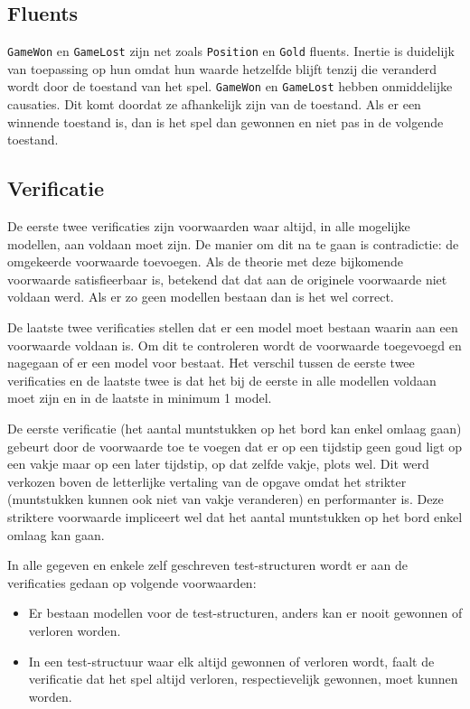 \documentclass[a4paper,12pt]{article}
\begin{document}
\subsection{Fluents}
\texttt{GameWon} en \texttt{GameLost} zijn net zoals \texttt{Position} en \texttt{Gold} fluents. Inertie is duidelijk van toepassing op hun omdat hun waarde hetzelfde blijft tenzij die veranderd wordt door de toestand van het spel. \texttt{GameWon} en \texttt{GameLost} hebben onmiddelijke causaties. Dit komt doordat ze afhankelijk zijn van de toestand. Als er een winnende toestand is, dan is het spel dan gewonnen en niet pas in de volgende toestand.

\subsection{Verificatie}
De eerste twee verificaties zijn voorwaarden waar altijd, in alle mogelijke modellen, aan voldaan moet zijn. De manier om dit na te gaan is contradictie: de omgekeerde voorwaarde toevoegen. Als de theorie met deze bijkomende voorwaarde satisfieerbaar is, betekend dat dat aan de originele voorwaarde niet voldaan werd. Als er zo geen modellen bestaan dan is het wel correct.

De laatste twee verificaties stellen dat er een model moet bestaan waarin aan een voorwaarde voldaan is. Om dit te controleren wordt de voorwaarde toegevoegd en nagegaan of er een model voor bestaat. Het verschil tussen de eerste twee verificaties en de laatste twee is dat het bij de eerste in alle modellen voldaan moet zijn en in de laatste in minimum 1 model.

De eerste verificatie (het aantal muntstukken op het bord kan enkel omlaag gaan) gebeurt door de voorwaarde toe te voegen dat er op een tijdstip geen goud ligt op een vakje maar op een later tijdstip, op dat zelfde vakje, plots wel. Dit werd verkozen boven de letterlijke vertaling van de opgave omdat het strikter (muntstukken kunnen ook niet van vakje veranderen) en performanter is. Deze striktere voorwaarde impliceert wel dat het aantal muntstukken op het bord enkel omlaag kan gaan.

In alle gegeven en enkele zelf geschreven test-structuren wordt er aan de verificaties gedaan op volgende voorwaarden:
\begin{itemize}
\item Er bestaan modellen voor de test-structuren, anders kan er nooit gewonnen of verloren worden.
\item In een test-structuur waar elk altijd gewonnen of verloren wordt, faalt de verificatie dat het spel altijd verloren, respectievelijk gewonnen, moet kunnen worden.
\end{itemize}
\end{document}
